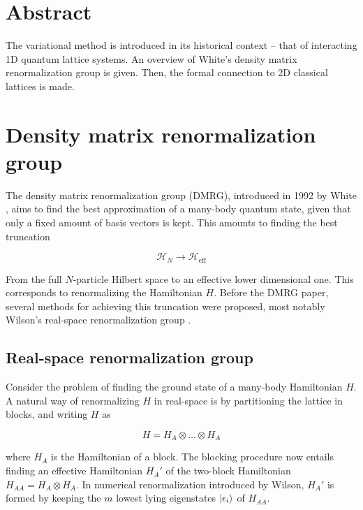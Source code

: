 \section{Abstract}

The variational method is introduced in its historical context -- that of
interacting 1D quantum lattice systems. An overview of White's density
matrix renormalization group \cite{white1992density} is given. Then, the
formal connection to 2D classical lattices is made.

\section{Density matrix renormalization group}

The density matrix renormalization group (DMRG), introduced in 1992 by
White \cite{white1992density}, aims to find the best approximation of
a many-body quantum state, given that only a fixed amount of basis vectors
is kept. This amounts to finding the best truncation

\begin{equation}
  \mathcal{H}_N \rightarrow \mathcal{H}_{\text{eff}}
\end{equation}

From the full $N$-particle Hilbert space to an effective lower dimensional
one. This corresponds to renormalizing the Hamiltonian $H$. Before the
DMRG paper, several methods for achieving this truncation were proposed,
most notably Wilson's real-space renormalization group
\cite{wilson1975renormalization}.

\subsection{Real-space renormalization group}

Consider the problem of finding the ground state of a many-body
Hamiltonian $H$. A natural way of renormalizing $H$ in real-space is by
partitioning the lattice in blocks, and writing $H$ as

\begin{equation}
  H = H_A \otimes \ldots \otimes H_A
\end{equation}

where $H_A$ is the Hamiltonian of a block.  The blocking procedure now
entails finding an effective Hamiltonian $H_{A}'$ of the two-block
Hamiltonian $H_{AA} = H_A \otimes H_A$. In numerical renormalization
introduced by Wilson, $H_{A}'$ is formed by keeping the $m$ lowest lying
eigenstates $\ket{\epsilon_{i}}$ of $H_{AA}$.


